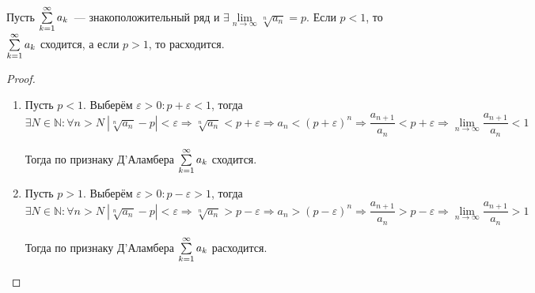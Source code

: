 \begin{theorem}
Пусть $\series a_k$~--- знакоположительный ряд и $\exists \lim\limits_{n \to \infty} \sqrt[n]{a_n} = p$.
Если $p < 1$, то $\series a_k$ сходится, а если $p > 1$, то расходится.
\end{theorem}
\begin{proof}
\begin{enumerate}
	\item Пусть $p < 1$.
	Выберём $\varepsilon > 0 \colon p + \varepsilon < 1$, тогда
	\begin{equation*}
	\exists N \in \mathbb N \colon \forall n > N \ \left| \sqrt[n]{a_n} - p \right| < \varepsilon \Rightarrow
	\sqrt[n]{a_n} < p + \varepsilon \Rightarrow
	a_n < (p + \varepsilon)^n \Rightarrow
	\frac{a_{n+1}}{a_n} < p + \varepsilon \Rightarrow
	\lim_{n \to \infty} \frac{a_{n+1}}{a_n} < 1
	\end{equation*}
	
	Тогда по признаку Д'Аламбера $\series a_k$ сходится.
	
	\item Пусть $p > 1$.
	Выберём $\varepsilon > 0 \colon p - \varepsilon > 1$, тогда
	\begin{equation*}
	\exists N \in \mathbb N \colon \forall n > N \ \left| \sqrt[n]{a_n} - p \right| < \varepsilon \Rightarrow
	\sqrt[n]{a_n} > p - \varepsilon \Rightarrow
	a_n > (p - \varepsilon)^n \Rightarrow
	\frac{a_{n+1}}{a_n} > p - \varepsilon \Rightarrow
	\lim_{n \to \infty} \frac{a_{n+1}}{a_n} > 1
	\end{equation*}
	
	Тогда по признаку Д'Аламбера $\series a_k$ расходится.
\end{enumerate}
\end{proof}

